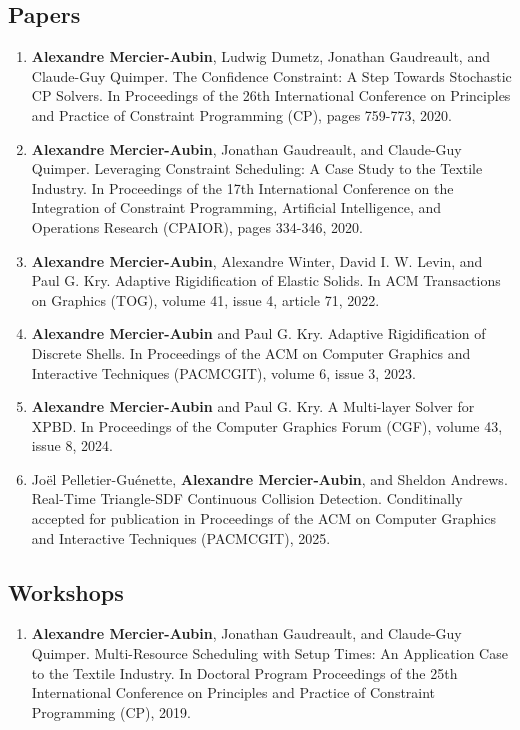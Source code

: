 \documentclass[10pt]{article} %
\begin{document}
\subsection{Papers}
%
%
\begin{enumerate}
  \setcounter{enumi}{\value{listCounter}}
  \item \textbf{Alexandre Mercier-Aubin}, Ludwig Dumetz, Jonathan Gaudreault, and Claude-Guy Quimper. The Confidence Constraint: A Step Towards Stochastic CP Solvers. In Proceedings of the 26th International Conference on Principles and Practice of Constraint Programming (CP), pages 759-773, 2020. 

 \item \textbf{Alexandre Mercier-Aubin}, Jonathan Gaudreault, and Claude-Guy Quimper. Leveraging Constraint Scheduling: A Case Study to the Textile Industry. In Proceedings of the 17th International Conference on the Integration of Constraint Programming, Artificial Intelligence, and Operations Research (CPAIOR), pages 334-346, 2020. 

 \item \textbf{Alexandre Mercier-Aubin},  Alexandre Winter,  David I. W. Levin, and Paul G. Kry. Adaptive Rigidification of Elastic Solids. In ACM Transactions on Graphics (TOG), volume 41, issue 4, article 71, 2022.  

 \item \textbf{Alexandre Mercier-Aubin} and Paul G. Kry. Adaptive Rigidification of Discrete Shells. In Proceedings of the ACM on Computer Graphics and Interactive Techniques (PACMCGIT), volume 6, issue 3, 2023. 

\item \textbf{Alexandre Mercier-Aubin} and Paul G. Kry. A Multi-layer Solver for XPBD. In Proceedings of the Computer Graphics Forum (CGF), volume 43, issue 8, 2024. 

\item Joël Pelletier-Guénette, \textbf{Alexandre Mercier-Aubin}, and Sheldon Andrews. Real-Time Triangle-SDF Continuous Collision Detection. Conditinally accepted for publication in Proceedings of the ACM on Computer Graphics and Interactive Techniques (PACMCGIT), 2025. 

\end{enumerate}


\subsection{Workshops}
\begin{enumerate}
  \setcounter{enumi}{\value{listCounter}}
  \item \textbf{Alexandre Mercier-Aubin}, Jonathan Gaudreault, and Claude-Guy Quimper. Multi-Resource Scheduling with Setup Times:
An Application Case to the Textile Industry. In Doctoral Program Proceedings of the 25th International
Conference on Principles and Practice of Constraint Programming (CP), 2019. 

\end{enumerate}
\end{document}
